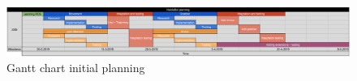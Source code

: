 \documentclass{beamer}
\begin{document}
\begin{frame}[t,fragile]
\begin{columns}[T,totalwidth=\textwidth]
\begin{column}{.48\textwidth}
	\end{column}


\end{columns}

\begin{figure}
    \centering
    \includegraphics[width=\textwidth]{graphics/planning.png}
    \caption{Gantt chart initial planning}
    \label{fig:gantt}
\end{figure}


\end{frame}
\end{document}
